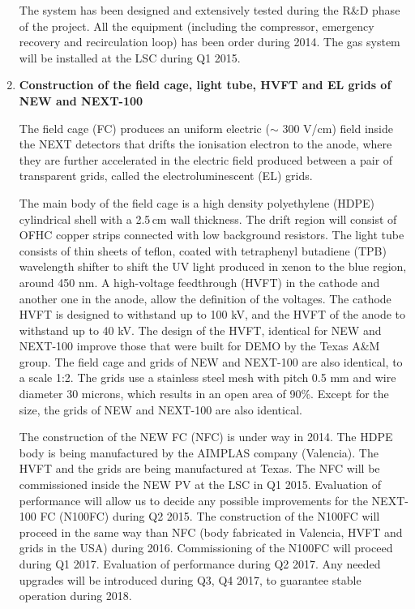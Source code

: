 \begin{enumerate}
The  system has been designed and extensively tested during the R\&D phase of the project. All the equipment (including the compressor, emergency recovery and recirculation loop) has been order during 2014. The gas system will be installed at the LSC during Q1 2015. 

\item {\bf Construction of the field cage, light tube, HVFT and EL grids of NEW and NEXT-100}

The field cage (FC) produces an uniform electric ($\sim$ 300 V/cm) field inside the NEXT detectors that drifts the ionisation electron to the anode, where they are further accelerated in the electric field produced between a pair of transparent grids, called the electroluminescent (EL) grids. 

The main body of the field cage is a high density polyethylene (HDPE) cylindrical shell with a 2.5\,cm wall thickness.  The drift region will consist of OFHC copper strips connected with low background resistors.  The light tube consists of thin sheets of teflon, coated with tetraphenyl butadiene (TPB) wavelength shifter to shift the UV light produced in xenon to the blue region, around 450 nm.  A high-voltage feedthrough (HVFT) in the cathode and another one in the anode, allow the definition of the voltages. The cathode HVFT is designed to withstand up to 100 kV, and the HVFT of the anode to withstand up to 40 kV. The design of the HVFT, identical for NEW and NEXT-100 improve those that were built for DEMO by the Texas A\&M group. The field cage and grids of NEW and NEXT-100 are also identical, to a scale 1:2. The grids use a stainless steel mesh with pitch 0.5 mm and wire diameter 30 microns, which results in an open area of 90\%. Except for the size, the grids of NEW and NEXT-100 are also identical. 

The construction of the NEW FC (NFC) is under way in 2014. The HDPE body is being manufactured by the AIMPLAS company (Valencia). The HVFT and the grids are being manufactured at Texas. The  NFC will be commissioned inside the NEW PV at the LSC in Q1 2015. Evaluation of performance will allow us to decide any possible improvements for the NEXT-100 FC (N100FC) during Q2 2015. The construction of the N100FC will proceed in the same way than NFC (body fabricated in Valencia, HVFT and grids in the USA) during 2016. Commissioning of the N100FC will proceed during Q1 2017. Evaluation of performance during Q2 2017. Any needed upgrades will be introduced during Q3, Q4 2017, to guarantee stable operation during 2018.  


\end{enumerate}
